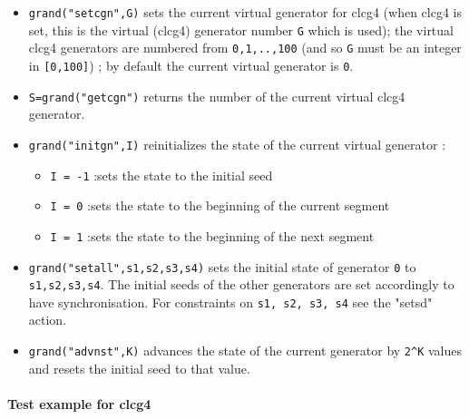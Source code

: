 \begin{itemize}
\item {} \verb!grand("setcgn",G)! sets the current virtual generator for clcg4 (when clcg4
  is set, this is the virtual (clcg4) generator number \verb!G! which is used);  the virtual clcg4 
  generators are numbered from \verb!0,1,..,100! (and so \verb!G! must be an integer 
  in  \verb![0,100]!) ; by default the current virtual generator is \verb!0!.
\item {} \verb!S=grand("getcgn")! returns the number of the current virtual clcg4 generator.
\item {} \verb!grand("initgn",I)!
  reinitializes the state of the current virtual generator :
      \begin{itemize}
      \item \verb!I = -1! :sets the state to the initial seed
      \item \verb!I = 0! :sets the state to the beginning of the current segment
      \item \verb!I = 1! :sets the state to the beginning of the next segment
      \end{itemize}
\item {} \verb!grand("setall",s1,s2,s3,s4)! sets the initial state of generator \verb!0! 
  to \verb!s1,s2,s3,s4!. The initial seeds of the other generators are set accordingly 
  to have synchronisation. For constraints on \verb!s1, s2, s3, s4! see the "setsd" action.
\item {} \verb!grand("advnst",K)! advances the state of the current generator by \verb!2^K! values 
  and  resets the initial seed to that value. 
\end{itemize}



\paragraph{Test example for clcg4}

